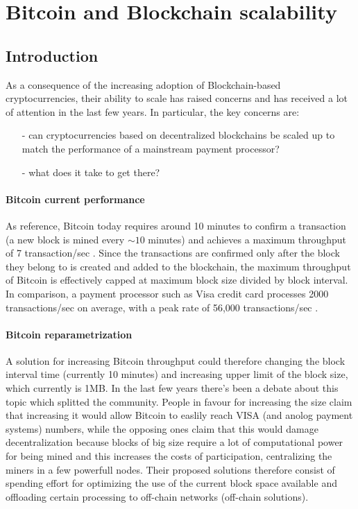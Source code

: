 \section{Bitcoin and Blockchain scalability}
\subsection{Introduction}
As a consequence of the increasing adoption of Blockchain-based cryptocurrencies,
their ability to scale has raised concerns and has received a lot of attention
in the last few years. In particular, the key concerns are:
\begin{itemize}
  \item[-] can cryptocurrencies based on decentralized blockchains be scaled up
  to match the performance of a mainstream payment processor?
  \item[-] what does it take to get there?
\end{itemize}

\paragraph{Bitcoin current performance} As reference, Bitcoin today requires
around 10 minutes to confirm a transaction (a new block is mined every $\sim10$
minutes) and achieves a maximum throughput of 7 transaction/sec
\cite{wikipedia_scalability_2018}. Since the transactions are confirmed only
after the block they belong to is created and added to the blockchain, the
maximum throughput of Bitcoin is effectively capped at maximum block size
divided by block interval. In comparison, a payment processor such as Visa
credit card processes 2000 transactions/sec on average, with a peak rate of
56,000 transactions/sec \cite{wikipedia_scalability_2018}.

\paragraph{Bitcoin reparametrization} A solution for increasing Bitcoin
throughput could therefore changing the block interval time (currently 10
minutes) and increasing upper limit of the block size, which currently is 1MB.
In the last few years there's been a debate about this topic which splitted the
community. People in favour for increasing the size claim that increasing it
would allow Bitcoin to easlily reach VISA (and anolog payment systems) numbers,
while the opposing ones claim that this would damage decentralization because
blocks of big size require a lot of computational power for being mined and this
increases the costs of participation, centralizing the miners in a few powerfull
nodes. Their proposed solutions therefore consist of spending effort for
optimizing the use of the current block space available and offloading certain
processing to off-chain networks (off-chain solutions).

